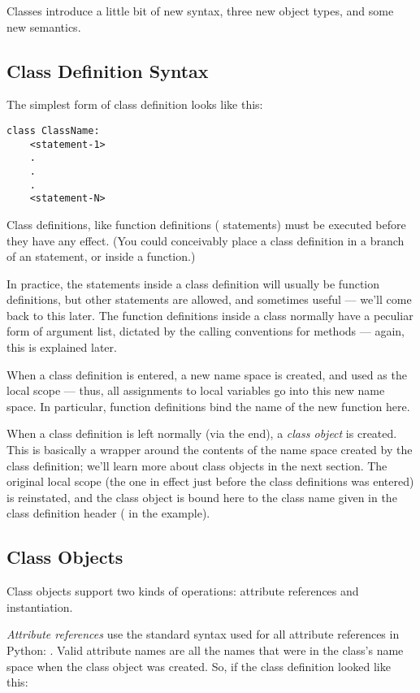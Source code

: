 \documentclass{manual}
\begin{document}
Classes introduce a little bit of new syntax, three new object types,
and some new semantics.


\subsection{Class Definition Syntax}
\label{classDefinition}

The simplest form of class definition looks like this:

\begin{verbatim}
class ClassName:
    <statement-1>
    .
    .
    .
    <statement-N>
\end{verbatim}

Class definitions, like function definitions (
statements) must be executed before they have any effect.  (You could
conceivably place a class definition in a branch of an 
statement, or inside a function.)

In practice, the statements inside a class definition will usually be
function definitions, but other statements are allowed, and sometimes
useful --- we'll come back to this later.  The function definitions
inside a class normally have a peculiar form of argument list,
dictated by the calling conventions for methods --- again, this is
explained later.

When a class definition is entered, a new name space is created, and
used as the local scope --- thus, all assignments to local variables
go into this new name space.  In particular, function definitions bind
the name of the new function here.

When a class definition is left normally (via the end), a \emph{class
object} is created.  This is basically a wrapper around the contents
of the name space created by the class definition; we'll learn more
about class objects in the next section.  The original local scope
(the one in effect just before the class definitions was entered) is
reinstated, and the class object is bound here to the class name given
in the class definition header ( in the example).


\subsection{Class Objects}
\label{classObjects}

Class objects support two kinds of operations: attribute references
and instantiation.

\emph{Attribute references} use the standard syntax used for all
attribute references in Python: .  Valid attribute
names are all the names that were in the class's name space when the
class object was created.  So, if the class definition looked like
this:
\end{document}
